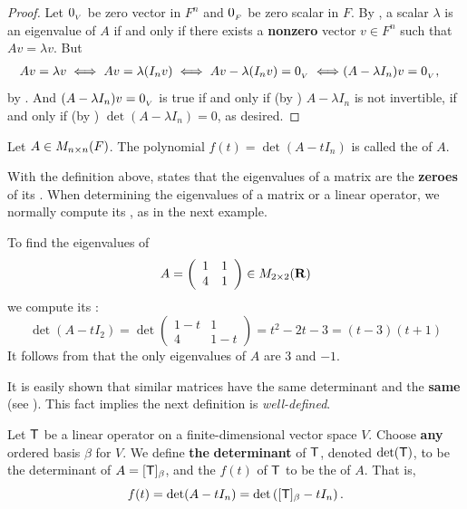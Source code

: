 \begin{proof}
Let \(0_{_V}\) be zero vector in \(F^n\) and \(0_{_F}\) be zero scalar in \(F\).
By , a scalar \(\lambda\) is an eigenvalue of \(A\) if and only if there exists a \textbf{nonzero} vector \(v \in F^n\) such that \(Av = \lambda v\).
But
\begin{align*}
    Av = \lambda v \iff Av = \lambda (I_n v) \iff Av - \lambda (I_n v) = 0_{_V} \iff & (A - \lambda I_n) v = 0_{_V},
\end{align*}
by .
And \((A - \lambda I_n) v = 0_{_V}\) is true if and only if (by ) \(A - \lambda I_n\) is not invertible,
if and only if (by ) \(\det(A - \lambda I_n) = 0\), as desired.
\end{proof}

\begin{definition} \label{def 5.3}
Let \(A \in M_{n \times n}(F)\).
The polynomial \(f(t) = \det(A - t I_n)\) is called the \textbf{\CPOLY{}} of \(A\).
\end{definition}

With the definition above,  states that the eigenvalues of a matrix are the \textbf{zeroes} of its \CPOLY{}.
When determining the eigenvalues of a matrix or a linear operator, we normally compute its \CPOLY{}, as in the next example.

\begin{example} \label{example 5.1.4}
To find the eigenvalues of
\[
    A = \left(\begin{array}{ll} 1 & 1 \\ 4 & 1 \end{array}\right) \in M_{2 \times 2}(\mathbf{R})
\]
we compute its \CPOLY{}:
\[
    \det\left(A - tI_2\right) = \det\left(\begin{array}{cc} 1-t & 1 \\ 4 & 1-t \end{array}\right)
    = t^{2} - 2 t - 3 = (t-3)(t+1)
\]
It follows from  that the only eigenvalues of \(A\) are \(3\) and \(-1\).
\end{example}

\begin{remark} \label{remark 5.1.6}
It is easily shown that similar matrices have the same determinant and the \textbf{same \CPOLY{}} (see ).
This fact implies the next definition is \emph{well-defined}.
\end{remark}

\begin{definition} \label{def 5.4}
Let \(\textsf{T}\) be a linear operator on a finite-dimensional vector space \(V\).
Choose \textbf{any} ordered basis \(\beta\) for \(V\).
We define \textbf{the} \textbf{determinant} of \(\textsf{T}\), denoted \(\det(\textsf{T})\), to be the determinant of \(A = [\textsf{T}]_{\beta}\),
and the \textbf{\CPOLY{}} \(f(t)\) of \(\textsf{T}\) to be the \CPOLY{} of \(A\).
That is,
\[
    f(t) = \det(A - t I_n) = \det \left( [\textsf{T}]_{\beta} - t I_n \right).
\]
\end{definition}

